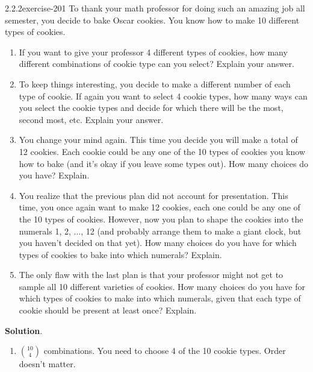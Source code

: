 \documentclass[twoside,11pt,]{book}
\numberwithin{equation}{chapter}
\begin{document}
\begin{divisionsolution}{2.2.2}{}{exercise-201}%
\hypertarget{p-3151}{}%
To thank your math professor for doing such an amazing job all semester, you decide to bake Oscar cookies. You know how to make 10 different types of cookies.\leavevmode%
\begin{enumerate}[label=(\alph*)]
\item\hypertarget{li-1844}{}\hypertarget{p-3152}{}%
If you want to give your professor 4 different types of cookies, how many different combinations of cookie type can you select? Explain your answer.%
\item\hypertarget{li-1845}{}\hypertarget{p-3154}{}%
To keep things interesting, you decide to make a different number of each type of cookie. If again you want to select 4 cookie types, how many ways can you select the cookie types and decide for which there will be the most, second most, etc. Explain your answer.%
\item\hypertarget{li-1846}{}\hypertarget{p-3156}{}%
You change your mind again. This time you decide you will make a total of 12 cookies. Each cookie could be any one of the 10 types of cookies you know how to bake (and it's okay if you leave some types out). How many choices do you have? Explain.%
\item\hypertarget{li-1847}{}\hypertarget{p-3158}{}%
You realize that the previous plan did not account for presentation. This time, you once again want to make 12 cookies, each one could be any one of the 10 types of cookies. However, now you plan to shape the cookies into the numerals 1, 2, ..., 12 (and probably arrange them to make a giant clock, but you haven't decided on that yet). How many choices do you have for which types of cookies to bake into which numerals? Explain.%
\item\hypertarget{li-1848}{}\hypertarget{p-3160}{}%
The only flaw with the last plan is that your professor might not get to sample all 10 different varieties of cookies. How many choices do you have for which types of cookies to make into which numerals, given that each type of cookie should be present at least once? Explain.%
\end{enumerate}
%
\par\smallskip%
\noindent\textbf{Solution}.\quad%
\hypertarget{p-3162}{}%
\leavevmode%
\begin{enumerate}[label=(\alph*)]
\item\hypertarget{li-1849}{}\hypertarget{p-3163}{}%
\({10 \choose 4}\) combinations. You need to choose 4 of the 10 cookie types. Order doesn't matter.%

\end{enumerate}
\end{divisionsolution}
\end{document}
